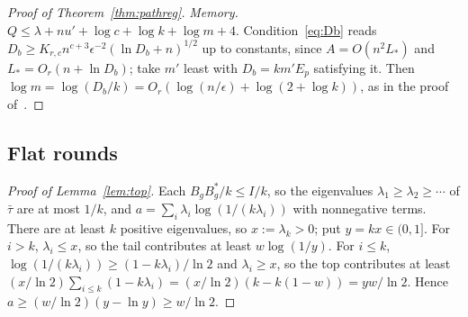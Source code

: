 \begin{proof}[Proof of Theorem~\ref{thm:pathreg}]
\emph{Memory.} $Q\le\lambda+nu'+\log c+\log k+\log m+4$. Condition~\eqref{eq:Db} reads $D_b\ge K_{r,c}n^{c+3}\epsilon^{-2}(\ln D_b+n)^{1/2}$ up to constants, since
$A=O(n^2L_*)$ and $L_*=O_r(n+\ln D_b)$; take $m'$ least with $D_b=km'E_p$ satisfying it. Then $\log m=\log(D_b/k)=O_r(\log(n/\epsilon)+\log(2+\log k))$, as in the
proof of~\cite[Theorem~12.2]{DouglasMghirbiC}.
\end{proof}

\subsection{Flat rounds}

\begin{proof}[Proof of Lemma~\ref{lem:top}]
Each $B_gB_g^*/k\le I/k$, so the eigenvalues $\lambda_1\ge\lambda_2\ge\cdots$ of $\bar\tau$ are at most $1/k$, and $a=\sum_i\lambda_i\log(1/(k\lambda_i))$ with nonnegative
terms. There are at least $k$ positive eigenvalues, so $x:=\lambda_k>0$; put $y=kx\in(0,1]$. For $i>k$, $\lambda_i\le x$, so the tail contributes at least $w\log(1/y)$.
For $i\le k$, $\log(1/(k\lambda_i))\ge(1-k\lambda_i)/\ln2$ and $\lambda_i\ge x$, so the top contributes at least $(x/\ln2)\sum_{i\le k}(1-k\lambda_i)=(x/\ln2)(k-k(1-w))=yw/\ln2$.
Hence $a\ge(w/\ln2)(y-\ln y)\ge w/\ln2$.
\end{proof}

